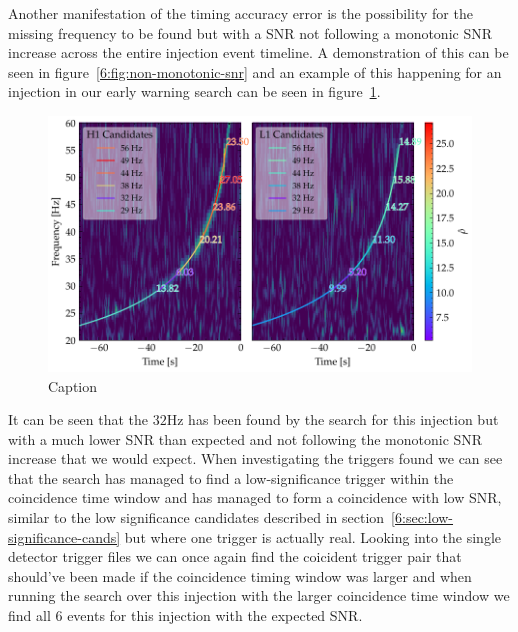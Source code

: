 Another manifestation of the timing accuracy error is the possibility for the missing frequency to be found but with a SNR not following a monotonic SNR increase across the entire injection event timeline. A demonstration of this can be seen in figure~\ref{6:fig:non-monotonic-snr} and an example of this happening for an injection in our early warning search can be seen in figure~\ref{6:fig:non_mono_eg}.
%
\begin{figure}
    \centering
    \includegraphics[width=1.0\linewidth]{images/6_earlywarning/stories/non_mono_example.pdf}
    \caption{Caption}
    \label{6:fig:non_mono_eg}
\end{figure}

It can be seen that the $32$Hz has been found by the search for this injection but with a much lower SNR than expected and not following the monotonic SNR increase that we would expect. When investigating the triggers found we can see that the search has managed to find a low-significance trigger within the coincidence time window and has managed to form a coincidence with low SNR, similar to the low significance candidates described in section~\ref{6:sec:low-significance-cands} but where one trigger is actually real. Looking into the single detector trigger files we can once again find the coicident trigger pair that should've been made if the coincidence timing window was larger and when running the search over this injection with the larger coincidence time window we find all $6$ events for this injection with the expected SNR.



